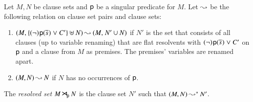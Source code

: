 \begin{defi}
\label{def:flat-res-set}
   Let $M, N$ be clause sets and $\mathsf{p}$ be a singular predicate for
   $M$. Let $\mathbin\leadsto$ be the following relation on clause set pairs and clause sets:
   \begin{enumerate}
   \item $(M{,}\> \{(\neg)\kern.2ex{\mathsf{p}(\overline{s}_{})} \mathrel{\lor} C'\} \uplus N) \mathbin\leadsto (M{,}\; N' \cup N)$ if
   $N'$ is the set that consists of all clauses (up to variable renaming) that are flat resolvents
   with $(\neg)\kern.2ex{\mathsf{p}(\overline{s}_{})} \mathrel{\lor} C'$ on $\mathsf{p}$ and a clause from $M$ as premises.
   The premises' variables are renamed apart.

   \smallskip
   \item $(M, N) \mathbin\leadsto N$ if $N$ has no occurrences of $\mathsf{p}$.
   \end{enumerate}
   \noindent  The \emph{resolved set} $M \mathbin{\smash{\hbox{\Large$\kern-.1ex\rtimes$}}}_{\!\mathsf{p}} N$ is the clause set $N'$ such that $(M,N) \mathbin\leadsto^* N'$.
\end{defi}

\pagebreak[2]

